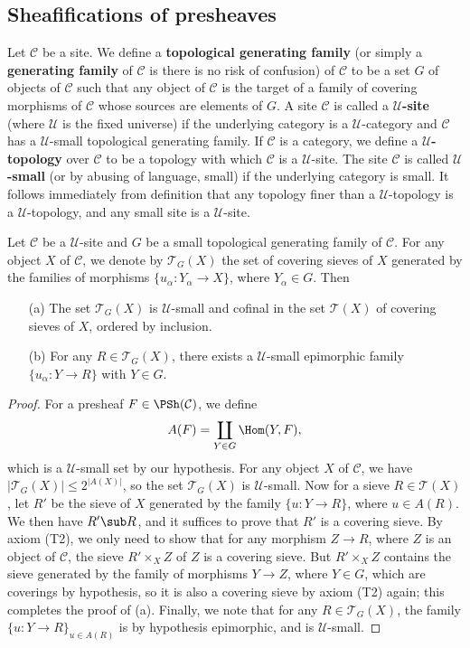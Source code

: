 \subsection{Sheafifications of presheaves}\label{site sheafification subsection}
Let $\mathcal{C}$ be a site. We define a \textbf{topological generating family} (or simply a \textbf{generating family} of $\mathcal{C}$ is there is no risk of confusion) of $\mathcal{C}$ to be a set $G$ of objects of $\mathcal{C}$ such that any object of $\mathcal{C}$ is the target of a family of covering morphisms of $\mathcal{C}$ whose sources are elements of $G$. A site $\mathcal{C}$ is called a \textbf{$\mathscr{U}$-site} (where $\mathscr{U}$ is the fixed universe) if the underlying category is a $\mathscr{U}$-category and $\mathcal{C}$ has a $\mathscr{U}$-small topological generating family. If $\mathcal{C}$ is a category, we define a \textbf{$\mathscr{U}$-topology} over $\mathcal{C}$ to be a topology with which $\mathcal{C}$ is a $\mathscr{U}$-site. The site $\mathcal{C}$ is called \textbf{$\mathscr{U}$-small} (or by abusing of language, small) if the underlying category is small. It follows immediately from definition that any topology finer than a $\mathscr{U}$-topology is a $\mathscr{U}$-topology, and any small site is a $\mathscr{U}$-site.
\begin{proposition}\label{site small generated sieve set prop}
Let $\mathcal{C}$ be a $\mathscr{U}$-site and $G$ be a small topological generating family of $\mathcal{C}$. For any object $X$ of $\mathcal{C}$, we denote by $\mathcal{T}_G(X)$ the set of covering sieves of $X$ generated by the families of morphisms $\{u_\alpha:Y_\alpha\to X\}$, where $Y_\alpha\in G$. Then
\begin{enumerate}
\item[(a)] The set $\mathcal{T}_G(X)$ is $\mathscr{U}$-small and cofinal in the set $\mathcal{T}(X)$ of covering sieves of $X$, ordered by inclusion.
\item[(b)] For any $R\in\mathcal{T}_G(X)$, there exists a $\mathscr{U}$-small epimorphic family $\{u_\alpha:Y\to R\}$ with $Y\in G$.
\end{enumerate}
\end{proposition}
\begin{proof}
For a presheaf $F\in\PSh(\mathcal{C})$, we define
\[A(F)=\coprod_{Y\in G}\Hom(Y,F),\]
which is a $\mathscr{U}$-small set by our hypothesis. For any object $X$ of $\mathcal{C}$, we have $|\mathcal{T}_G(X)|\leq 2^{|A(X)|}$, so the set $\mathcal{T}_G(X)$ is $\mathscr{U}$-small. Now for a sieve $R\in\mathcal{T}(X)$, let $R'$ be the sieve of $X$ generated by the family $\{u:Y\to R\}$, where $u\in A(R)$. We then have $R'\sub R$, and it suffices to prove that $R'$ is a covering sieve. By axiom (T2), we only need to show that for any morphism $Z\to R$, where $Z$ is an object of $\mathcal{C}$, the sieve $R'\times_XZ$ of $Z$ is a covering sieve. But $R'\times_XZ$ contains the sieve generated by the family of morphisms $Y\to Z$, where $Y\in G$, which are coverings by hypothesis, so it is also a covering sieve by axiom (T2) again; this completes the proof of (a). Finally, we note that for any $R\in \mathcal{T}_G(X)$, the family $\{u:Y\to R\}_{u\in A(R)}$ is by hypothesis epimorphic, and is $\mathscr{U}$-small.
\end{proof}
